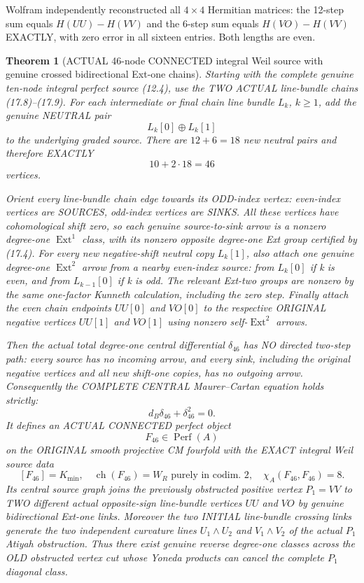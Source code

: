 \documentclass[11pt,a4paper]{article}
\newcommand{\ch}{\operatorname{ch}}
\newtheorem{theorem}{Theorem}[section]
\begin{document}
Wolfram
independently
reconstructed
all \(4\times4\)
Hermitian
matrices:
the
12-step
sum equals
\(H(UU)-H(VV)\)
and the
6-step
sum equals
\(H(VO)-H(VV)\)
EXACTLY,
with zero
error in
all sixteen
entries.
Both lengths
are even.

\begin{theorem}[ACTUAL 46-node CONNECTED integral Weil source with genuine crossed bidirectional Ext-one chains]
Starting with
the complete
genuine ten-node
integral perfect
source (12.4),
use the
TWO ACTUAL
line-bundle
chains
(17.8)--(17.9).
For each
intermediate
or final chain
line bundle
\(L_k\),
\(k\ge1\),
add the
genuine
NEUTRAL
pair
\[
        L_k[0]\oplus L_k[1]
\]
to the
underlying
graded source.
There are
\(12+6=18\)
new neutral
pairs and
therefore
EXACTLY
\[
 \boxed{10+2\cdot18=46}
\]
vertices.

Orient every
line-bundle
chain edge
towards its
ODD-index
vertex:
even-index
vertices
are SOURCES,
odd-index
vertices
are SINKS.
All these
vertices have
cohomological
shift zero,
so each
genuine
source-to-sink
arrow is a
nonzero
degree-one
\(\operatorname{Ext}^1\)
class,
with its
nonzero
opposite
degree-one
Ext group
certified
by (17.4).
For every
new
negative-shift
neutral
copy
\(L_k[1]\),
also attach
one genuine
degree-one
\(\operatorname{Ext}^2\)
arrow from
a nearby
even-index
source:
from \(L_k[0]\)
if k is
even, and
from
\(L_{k-1}[0]\)
if k is
odd.
The relevant
Ext-two
groups are
nonzero
by the
same
one-factor
Kunneth
calculation,
including
the zero
step.
Finally attach
the even
chain endpoints
\(UU[0]\)
and \(VO[0]\)
to the
respective
ORIGINAL
negative
vertices
\(UU[1]\)
and \(VO[1]\)
using nonzero
self-\(\operatorname{Ext}^2\)
arrows.

Then the
actual total
degree-one
central
differential
\(\delta_{46}\)
has NO directed
two-step path:
every source
has no incoming
arrow, and
every sink,
including
the original
negative
vertices and
all new
shift-one
copies, has
no outgoing
arrow.
Consequently
the COMPLETE
CENTRAL
Maurer--Cartan
equation
holds strictly:
\[
 \boxed{
       d_B\delta_{46}
          +\delta_{46}^2=0.
 }                                                       \tag{17.10}
\]
It defines
an ACTUAL
CONNECTED
perfect object
\[
 \boxed{
 F_{46}\in\operatorname{Perf}(A)
 }
\]
on the
ORIGINAL
smooth
projective CM
fourfold with
the EXACT
integral
Weil source
data
\[
 \boxed{
 [F_{46}]=K_{\min},\quad
 \ch(F_{46})=W_R
        \text{ purely in codim.\ 2},
 \quad
 \chi_A(F_{46},F_{46})=8.
 }                                                       \tag{17.11}
\]
Its central
source graph
joins the
previously
obstructed
positive vertex
\(P_1=VV\)
to TWO
different actual
opposite-sign
line-bundle
vertices
\(UU\) and \(VO\)
by genuine
bidirectional
Ext-one
links.
Moreover the
two INITIAL
line-bundle
crossing
links
generate the
two independent
curvature lines
\(U_1\wedge U_2\)
and
\(V_1\wedge V_2\)
of the actual
\(P_1\)
Atiyah
obstruction.
Thus there
exist genuine
reverse
degree-one
classes across
the OLD
obstructed
vertex cut
whose
Yoneda products
can cancel
the complete
\(P_1\)
diagonal
class.
\end{theorem}
\end{document}

